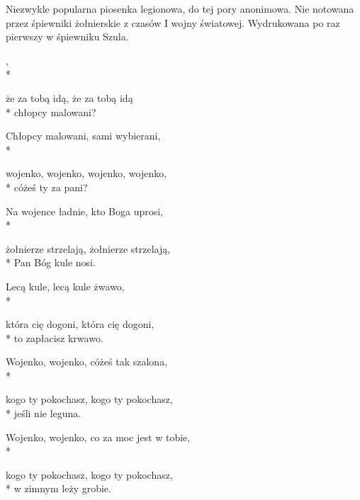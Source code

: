\begin{info}Niezwykle popularna piosenka legionowa, do tej pory anonimowa. Nie notowana przez śpiewniki żołnierskie z czasów I wojny światowej. Wydrukowana po raz pierwszy w śpiewniku Szula.
 \end{info}

\begin{lyrics}[longestline={żołnierze strzelają, żołnierze strzelają,}]

,\\*
\begin{markverses}%
że za tobą idą, że za tobą idą\\*
chłopcy malowani?
\end{markverses}

Chłopcy malowani, sami wybierani,\\*
\begin{markverses}%
wojenko, wojenko, wojenko, wojenko,\\*
cóżeś ty za pani?
\end{markverses}

Na wojence ładnie, kto Boga uprosi,\\*
\begin{markverses}%
żołnierze strzelają, żołnierze strzelają,\\*
Pan Bóg kule nosi.
\end{markverses}

Lecą kule, lecą kule żwawo,\\*
\begin{markverses}%
która cię dogoni, która cię dogoni,\\*
to zapłacisz krwawo.
\end{markverses}

Wojenko, wojenko, cóżeś tak szalona,\\*
\begin{markverses}%
kogo ty pokochasz, kogo ty pokochasz,\\*
jeśli nie leguna.
\end{markverses}

Wojenko, wojenko, co za moc jest w tobie,\\*
\begin{markverses}%
kogo ty pokochasz, kogo ty pokochasz,\\*
w zimnym leży grobie.
\end{markverses}
\end{lyrics}



